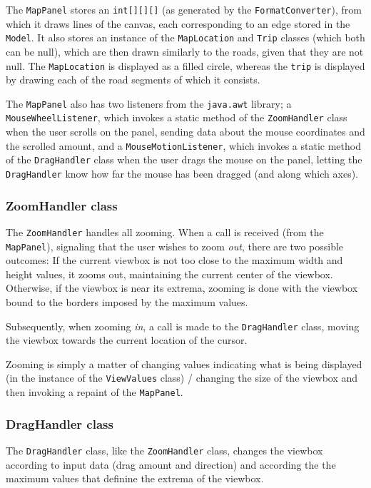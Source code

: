 The \texttt{MapPanel} stores an \texttt{int[][][]} (as generated by the \texttt{FormatConverter}), from which it draws lines of the canvas, each corresponding to an edge stored in the \texttt{Model}. It also stores an instance of the \texttt{MapLocation} and \texttt{Trip} classes (which both can be null), which are then drawn similarly to the roads, given that they are not null. The \texttt{MapLocation} is displayed as a filled circle, whereas the \texttt{trip} is displayed by drawing each of the road segments of which it consists.

The \texttt{MapPanel} also has two listeners from the \texttt{java.awt} library; a \\\texttt{MouseWheelListener}, which invokes a static method of the \texttt{ZoomHandler} class when the user scrolls on the panel, sending data about the mouse coordinates and the scrolled amount, and a \texttt{MouseMotionListener}, which invokes a static method of the \texttt{DragHandler} class when the user drags the mouse on the panel, letting the \texttt{DragHandler} know how far the mouse has been dragged (and along which axes).

\subsubsection{ZoomHandler class} %
The \texttt{ZoomHandler} handles all zooming. When a call is received (from the \texttt{MapPanel}), signaling that the user wishes to zoom \textsl{out}, there are two possible outcomes: If the current viewbox is not too close to the maximum width and height values, it zooms out, maintaining the current center of the viewbox. Otherwise, if the viewbox is near its extrema, zooming is done with the viewbox bound to the borders imposed by the maximum values.

Subsequently, when zooming \textsl{in}, a call is made to the \texttt{DragHandler} class, moving the viewbox towards the current location of the cursor.

Zooming is simply a matter of changing values indicating what is being displayed (in the instance of the \texttt{ViewValues} class) / changing the size of the viewbox and then invoking a repaint of the \texttt{MapPanel}.

\subsubsection{DragHandler class} %
The \texttt{DragHandler} class, like the \texttt{ZoomHandler} class, changes the viewbox according to input data (drag amount and direction) and according the the maximum values that definine the extrema of the viewbox.

